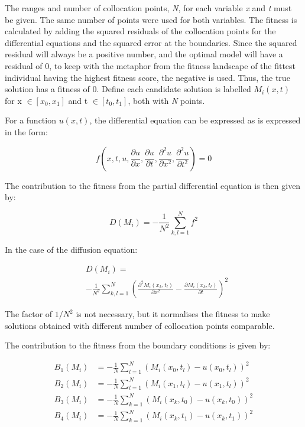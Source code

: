 \documentclass[multicolumn, 12pt]{extarticle}
\begin{document}
The ranges and number of collocation points, \textit{N}, for each variable \textit{x} and \textit{t} must be given. The same number of points were used for both variables. The fitness is calculated by adding the squared residuals of the collocation points for the differential equations and the squared error at the boundaries. Since the squared residual will always be a positive number, and the optimal model will have a residual of 0, to keep with the metaphor from the fitness landscape of the fittest individual having the highest fitness score, the negative is used. Thus, the true solution has a fitness of 0. Define each candidate solution is labelled $M_{i}(x, t)$ for x $\in [x_{0}, x_{1}]$ and t $\in [t_{0}, t_{1}]$, both with \textit{N} points. 

For a function $u(x, t)$, the differential equation can be expressed as is expressed in the form:

\begin{equation*}
    f \left( x, t, u, \frac{\partial u}{\partial x}, \frac{\partial u}{\partial t}, \frac{\partial^2 u }{\partial x^2}, \frac{\partial^2 u}{\partial t^2} \right) = 0
\end{equation*}


The contribution to the fitness from the partial differential equation is then given by: 

\begin{equation*}
    D(M_{i}) = -\frac{1}{N^{2}}\sum_{k, l=1}^{N} f^2
\end{equation*}

In the case of the diffusion equation: 

\begin{align*}
    &D(M_{i}) = \\
    & - \frac{1}{N^{2}} \sum_{k, l=1}^{N} \left( \frac{\partial^2 M_i(x_k, t_l) }{\partial x^2} - \frac{\partial M_i(x_k, t_l)}{\partial t} \right) ^2
\end{align*}

The factor of $1/N^{2}$ is not necessary, but it normalises the fitness to make solutions obtained with different number of collocation points comparable. 


The contribution to the fitness from the boundary conditions is given by: 

\begin{align*}
    B_1(M_{i}) & = -\frac{1}{N} \sum_{l=1}^{N} \left( M_i(x_0, t_l)- u(x_0, t_l)\right) ^2  \\
    B_2(M_{i}) & = -\frac{1}{N} \sum_{l=1}^{N} (M_i(x_1, t_l)- u(x_1, t_l))^2  \\
    B_3(M_{i}) & = -\frac{1}{N} \sum_{k=1}^{N} (M_i(x_k, t_0)- u(x_k, t_0))^2  \\
    B_4(M_{i}) & = -\frac{1}{N} \sum_{k=1}^{N} (M_i(x_k, t_1)- u(x_k, t_1))^2  \\
\end{align*}
\end{document}
